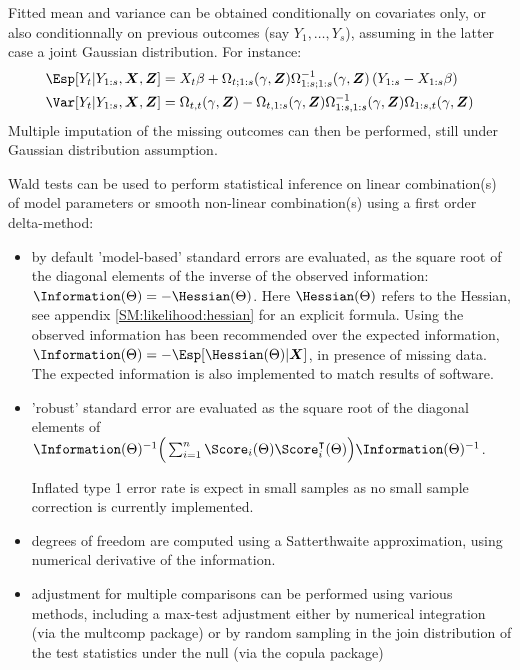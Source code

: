 \documentclass[12pt]{article}
\newcommand\Warning[1][3ex]{%
\renewcommand\stacktype{L}%
\scaleto{\stackon[1.3pt]{\color{red}$\triangle$}{\tiny\bfseries !}}{#1}%
\xspace
}
\newcommand\trans[1]{{#1}^\intercal}%
\newcommand{\VX}{\boldsymbol{X}}
\newcommand{\VZ}{\boldsymbol{Z}}
\begin{document}
\noindent Fitted mean and variance can be obtained conditionally on
covariates only, or also conditionnally on previous outcomes (say
\(Y_1,\ldots,Y_s\)), assuming in the latter case a joint Gaussian
distribution. For instance:
\begin{align*}
\Esp[Y_t | Y_{1:s}, \VX, \VZ] &= X_t \beta + \Omega_{t;1:s}(\gamma,\VZ) \Omega^{-1}_{1:s;1:s}(\gamma,\VZ) \left(Y_{1:s} - X_{1:s} \beta\right) \\
\Var[Y_t | Y_{1:s}, \VX, \VZ] &= \Omega_{t,t}(\gamma,\VZ)-\Omega_{t,1:s}(\gamma,\VZ)\Omega^{-1}_{1:s,1:s}(\gamma,\VZ)\Omega_{1:s,t}(\gamma,\VZ)
\end{align*}
Multiple imputation of the missing outcomes can then be performed,
still under Gaussian distribution assumption.

\clearpage

Wald tests can be used to perform statistical inference on linear
combination(s) of model parameters or smooth non-linear combination(s)
using a first order delta-method:
\begin{itemize}
\item by default 'model-based' standard errors are evaluated, as the
square root of the diagonal elements of the inverse of the observed
information: \(\Information(\Theta)=-\Hessian(\Theta)\). Here
\(\Hessian(\Theta)\) refers to the Hessian, see appendix
\ref{SM:likelihood:hessian} for an explicit formula. Using the observed
information has been recommended \citep{thomadakis2023issues} over the
expected information,
\(\Information(\Theta)=-\Esp[\Hessian(\Theta)|\VX]\), in presence of
missing data. The expected information is also implemented to match
results of software.
\item 'robust' standard error are evaluated as the square root of the
diagonal elements of \newline \({\Information(\Theta)^{-1} \Big(\sum_{i=1}^n
  \Score_i(\Theta)\trans{\Score}_i(\Theta)\Big)\Information(\Theta)^{-1}}\). \Warning Inflated type 1 error rate is expect in small samples
as no small sample correction is currently implemented.
\item degrees of freedom are computed using a Satterthwaite approximation,
using numerical derivative of the information.
\item adjustment for multiple comparisons can be performed using various
methods, including a max-test adjustment either by numerical
integration (via the multcomp package) or by random sampling in the
join distribution of the test statistics under the null (via the
copula package)
\end{itemize}
\end{document}
